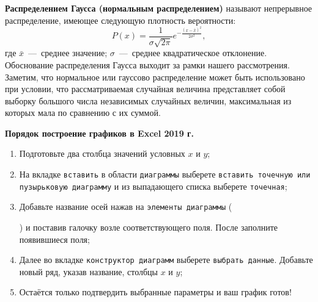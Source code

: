 \documentclass[14pt,a4paper]{article}
\begin{document}
\textbf{Распределением Гаусса (нормальным распределением)} называют непрерывное распределение, имеющее следующую плотность вероятности:\\
\begin{equation} \label{normalDistribution}
    P(x)  = \frac{1}{\sigma \sqrt{2\pi}}e^{-\frac{(x-\bar{x})^2}{2\sigma^2}},
\end{equation}
где $\bar{x}$~---~среднее значение; $\sigma$~---~среднее квадратическое отклонение. Обоснование распределения Гаусса выходит за рамки нашего рассмотрения. Заметим, что нормальное или гауссово распределение может быть использовано при условии, что рассматриваемая случайная величина представляет собой выборку большого числа независимых случайных величин, максимальная из которых мала по сравнению с их суммой.

    
\textbf{Порядок построение графиков в Excel 2019 г.}
\begin{enumerate}
    \item Подготовьте два столбца значений условных $x$ и $y$;
    \item На вкладке \texttt{вставить} в области \texttt{диаграммы} выберете \texttt{вставить точечную или пузырьковую диаграмму} и из выпадающего списка выберете \texttt{точечная};
    \item Добавьте название осей нажав на \texttt{элементы диаграммы} () и поставив галочку возле соответствующего поля. После заполните появившиеся поля;
    \item Далее во вкладке \texttt{конструктор диаграмм} выберете \texttt{выбрать данные}. Добавьте новый ряд, указав название, столбцы $x$ и $y$;
    \item Остаётся только подтвердить выбранные параметры и ваш график готов!
\end{enumerate}
\end{document}
